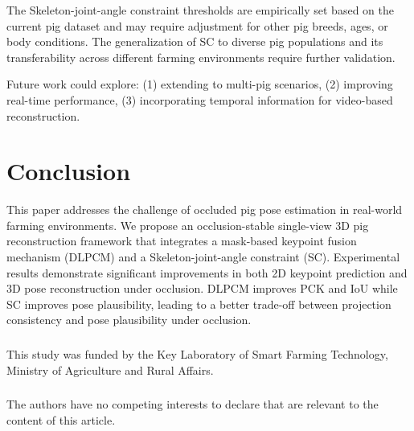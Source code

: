 \documentclass[runningheads]{llncs}
\begin{document}
The Skeleton-joint-angle constraint thresholds are empirically set based on the current pig dataset and may require adjustment for other pig breeds, ages, or body conditions. The generalization of SC to diverse pig populations and its transferability across different farming environments require further validation.

Future work could explore: (1) extending to multi-pig scenarios, (2) improving real-time performance, (3) incorporating temporal information for video-based reconstruction.

\section{Conclusion}
\label{sec:conclusion}

This paper addresses the challenge of occluded pig pose estimation in real-world farming environments. We propose an occlusion-stable single-view 3D pig reconstruction framework that integrates a mask-based keypoint fusion mechanism (DLPCM) and a Skeleton-joint-angle constraint (SC). Experimental results demonstrate significant improvements in both 2D keypoint prediction and 3D pose reconstruction under occlusion. DLPCM improves PCK and IoU while SC improves pose plausibility, leading to a better trade-off between projection consistency and pose plausibility under occlusion.

\begin{credits}
\subsubsection{\ackname}
This study was funded by the Key Laboratory of Smart Farming Technology, Ministry of Agriculture and Rural Affairs.

\subsubsection{\discintname}
The authors have no competing interests to declare that are relevant to the content of this article.
\end{credits}
\end{document}
